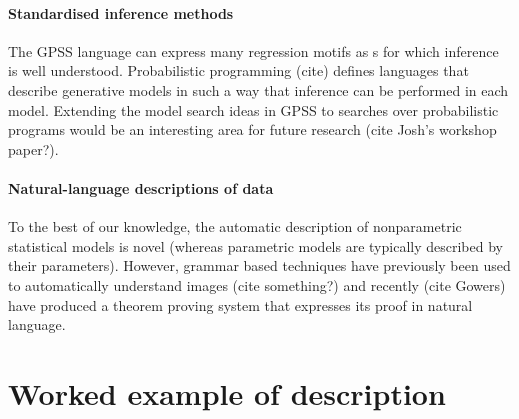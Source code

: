 \documentclass{article}
\begin{document}
\paragraph{Standardised inference methods}
The GPSS language can express many regression motifs as \gp{}s for which inference is well understood.
Probabilistic programming (cite) defines languages that describe generative models in such a way that inference can be performed in each model.
Extending the model search ideas in GPSS to searches over probabilistic programs would be an interesting area for future research (cite Josh's workshop paper?).

\paragraph{Natural-language descriptions of data}

To the best of our knowledge, the automatic description of nonparametric statistical models is novel (whereas parametric models are typically described by their parameters).
However, grammar based techniques have previously been used to automatically understand images (cite something?) and recently (cite Gowers) have produced a theorem proving system that expresses its proof in natural language.






\section{Worked example of description}

\end{document}
